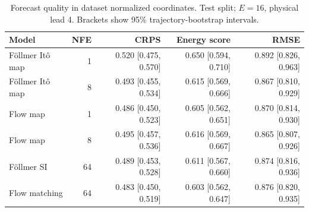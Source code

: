 \begin{table}[t]
\centering
\small
\setlength{\tabcolsep}{3pt}
\caption{Forecast quality in dataset normalized coordinates. Test split; $E=16$, physical lead 4. Brackets show 95\% trajectory-bootstrap intervals.}
\label{tab:map-quality}
\begin{tabular}{lrrrr}
\toprule
Model & NFE & CRPS & Energy score & RMSE \\
\midrule
Föllmer Itô map & 1 & 0.520 [0.475, 0.570] & 0.650 [0.594, 0.710] & 0.892 [0.826, 0.963] \\
Föllmer Itô map & 8 & 0.493 [0.455, 0.534] & 0.615 [0.569, 0.666] & 0.867 [0.810, 0.929] \\
\addlinespace
Flow map & 1 & 0.486 [0.450, 0.523] & 0.605 [0.562, 0.651] & 0.870 [0.814, 0.930] \\
Flow map & 8 & 0.495 [0.457, 0.536] & 0.616 [0.569, 0.667] & 0.865 [0.807, 0.926] \\
\addlinespace
Föllmer SI & 64 & 0.489 [0.453, 0.528] & 0.611 [0.567, 0.660] & 0.874 [0.816, 0.936] \\
\addlinespace
Flow matching & 64 & 0.483 [0.450, 0.519] & 0.603 [0.562, 0.647] & 0.876 [0.820, 0.935] \\
\bottomrule
\end{tabular}
\end{table}
